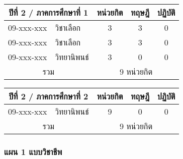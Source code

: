 \vspace{5ex}\par\noindent
\renewcommand{\arraystretch}{1.4}
\begin{tabular}{|cp{}|ccc|}
\hline
\multicolumn{2}{|c|}{ปีที่ 2 / ภาคการศึกษาที่ 1} & \multicolumn{1}{c|}{หน่วยกิต} & \multicolumn{1}{c|}{ทฤษฎี} & \multicolumn{1}{c|}{ปฏิบัติ}  \\ \hline
\multicolumn{1}{|c|}{09-xxx-xxx}  & วิชาเลือก  & \multicolumn{1}{c|}{3}        & \multicolumn{1}{c|}{3}     & \multicolumn{1}{c|}{0}                    \\ \hline
\multicolumn{1}{|c|}{09-xxx-xxx}  & วิชาเลือก  & \multicolumn{1}{c|}{3}        & \multicolumn{1}{c|}{3}     & \multicolumn{1}{c|}{0}                    \\ \hline
\multicolumn{1}{|c|}{09-xxx-xxx}  & วิทยานิพนธ์  & \multicolumn{1}{c|}{3}        & \multicolumn{1}{c|}{0}     & \multicolumn{1}{c|}{0}                    \\ \hline
\multicolumn{2}{|c|}{รวม}                        & \multicolumn{3}{c|}{9 หน่วยกิต}                                                                            \\ \hline
\end{tabular}

\vspace{5ex}\par\noindent
\renewcommand{\arraystretch}{1.4}
\begin{tabular}{|cp{}|ccc|}
\hline
\multicolumn{2}{|c|}{ปีที่ 2 / ภาคการศึกษาที่ 2} & \multicolumn{1}{c|}{หน่วยกิต} & \multicolumn{1}{c|}{ทฤษฎี} & \multicolumn{1}{c|}{ปฏิบัติ}  \\ \hline
\multicolumn{1}{|c|}{09-xxx-xxx}  & วิทยานิพนธ์  & \multicolumn{1}{c|}{9}        & \multicolumn{1}{c|}{0}     & \multicolumn{1}{c|}{0}                    \\ \hline
\multicolumn{2}{|c|}{รวม}                        & \multicolumn{3}{c|}{9 หน่วยกิต}                                                                            \\ \hline
\end{tabular}


\newpage
\subsubsection*{แผน 1 แบบวิชาชีพ}


